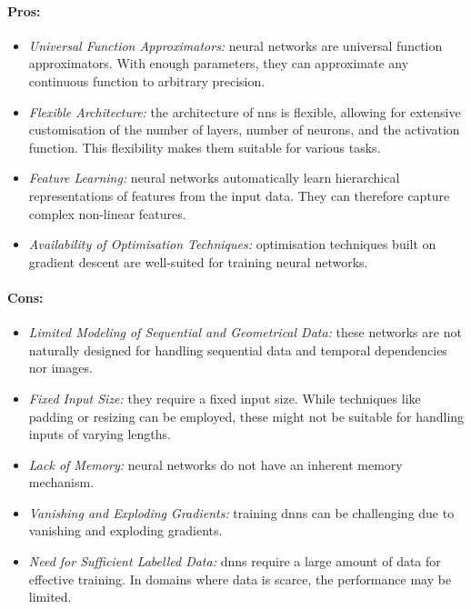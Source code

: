 \paragraph{Pros:}
\begin{itemize}
    \item \textit{Universal Function Approximators:} neural networks are universal function approximators. With enough parameters, they can approximate any continuous function to arbitrary precision.
    \item \textit{Flexible Architecture:} the architecture of \glspl{nn} is flexible, allowing for extensive customisation of the number of layers, number of neurons, and the activation function. This flexibility makes them suitable for various tasks.
    \item \textit{Feature Learning:} neural networks automatically learn hierarchical representations of features from the input data. They can therefore capture complex non-linear features.
    \item \textit{Availability of Optimisation Techniques:} optimisation techniques built on gradient descent are well-suited for training neural networks. 
\end{itemize}

\paragraph{Cons:}
\begin{itemize}
    \item \textit{Limited Modeling of Sequential and Geometrical Data:} these networks are not naturally designed for handling sequential data and temporal dependencies nor images.
    \item \textit{Fixed Input Size:} they require a fixed input size. While techniques like padding or resizing can be employed, these might not be suitable for handling inputs of varying lengths.
    \item \textit{Lack of Memory:} neural networks do not have an inherent memory mechanism.
    \item \textit{Vanishing and Exploding Gradients:} training \glspl{dnn} can be challenging due to vanishing and exploding gradients.
    \item \textit{Need for Sufficient Labelled Data:} \glspl{dnn} require a large amount of data for effective training. In domains where data is scarce, the performance may be limited.
\end{itemize}

